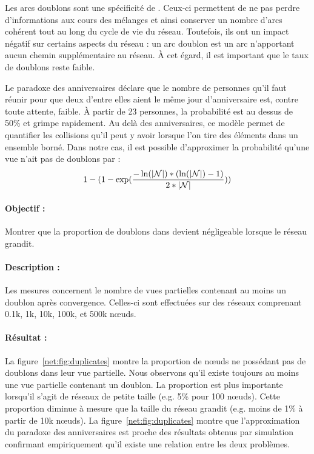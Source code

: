 Les arcs doublons sont une spécificité de \SPRAY. Ceux-ci permettent de ne pas
perdre d'informations aux cours des mélanges et ainsi conserver un nombre
d'arcs cohérent tout au long du cycle de vie du réseau. Toutefois, ils ont un
impact négatif sur certains aspects du réseau : un arc doublon est un arc
n'apportant aucun chemin supplémentaire au réseau. À cet égard, il est important
que le taux de doublons reste faible.

Le paradoxe des anniversaires déclare que le nombre de personnes qu'il faut
réunir pour que deux d'entre elles aient le même jour d'anniversaire est, contre
toute attente, faible. À partir de 23 personnes, la probabilité est au dessus de
50\% et grimpe rapidement. Au delà des anniversaires, ce modèle permet de
quantifier les collisions qu'il peut y avoir lorsque l'on tire des éléments dans
un ensemble borné. Dans notre cas, il est possible d'approximer la probabilité
qu'une vue n'ait pas de doublons par :
\begin{equation*}
  1-
  (1-
  \exp({-\ln(|\mathcal{N}|)*(\ln(|\mathcal{N}|)-1)\over{2*|\mathcal{N}|}}))
\end{equation*}

\paragraph{Objectif :} Montrer que la proportion de doublons dans \SPRAY devient
négligeable lorsque le réseau grandit.

\paragraph{Description :} Les mesures concernent le nombre de vues partielles
contenant au moins un doublon après convergence. Celles-ci sont effectuées sur
des réseaux comprenant 0.1k, 1k, 10k, 100k, et 500k nœuds.

\paragraph{Résultat :} La figure~\ref{net:fig:duplicates} montre la proportion
de nœuds ne possédant pas de doublons dans leur vue partielle. Nous observons
qu'il existe toujours au moins une vue partielle contenant un doublon. La
proportion est plus importante lorsqu'il s'agit de réseaux de petite taille
(e.g. 5\% pour 100 nœuds). Cette proportion diminue à mesure que la taille du
réseau grandit (e.g. moins de 1\% à partir de 10k nœuds). La
figure~\ref{net:fig:duplicates} montre que l'approximation du paradoxe des
anniversaires est proche des résultats obtenus par simulation confirmant
empiriquement qu'il existe une relation entre les deux problèmes.

